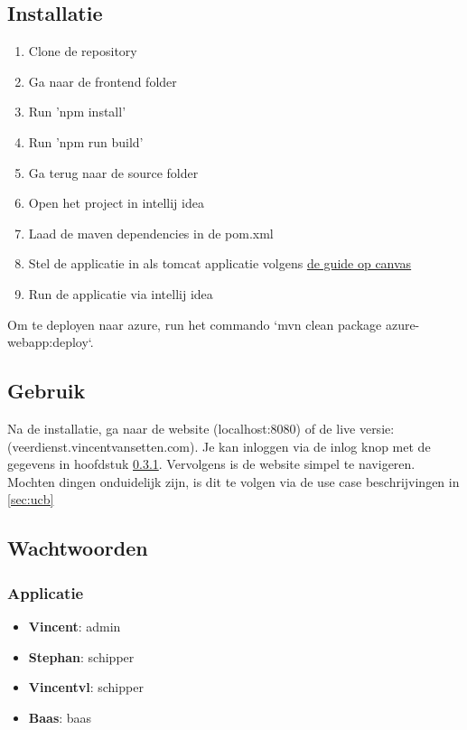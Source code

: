 \documentclass{article}
\begin{document}
\subsection{Installatie}
\begin{enumerate}
    \item Clone de repository  
    \item Ga naar de frontend folder 
    \item Run 'npm install'
    \item Run 'npm run build'
    \item Ga terug naar de source folder 
    \item Open het project in intellij idea 
    \item Laad de maven dependencies in de pom.xml 
    \item Stel de applicatie in als tomcat applicatie volgens \href{https://canvas.hu.nl/courses/39721/pages/installatie-en-configuratie-tomcat-server-intellij-idea?module_item_id=1068106}{de guide op canvas}
    \item Run de applicatie via intellij idea
\end{enumerate}
Om te deployen naar azure, run het commando `mvn clean package azure-webapp:deploy`.

\subsection{Gebruik}
Na de installatie, ga naar de website (localhost:8080) of de live versie: (veerdienst.vincentvansetten.com).
Je kan inloggen via de inlog knop met de gegevens in hoofdstuk \ref{sec:wachtwoorden}.
Vervolgens is de website simpel te navigeren. Mochten dingen onduidelijk zijn, is dit te volgen via de use case beschrijvingen in \ref{sec:ucb}


\subsection{Wachtwoorden}
\subsubsection{Applicatie}
\label{sec:wachtwoorden}
\begin{itemize}
    \item \textbf{Vincent}: admin 
    \item \textbf{Stephan}: schipper 
    \item \textbf{Vincentvl}: schipper 
    \item \textbf{Baas}: baas
\end{itemize}
\end{document}

